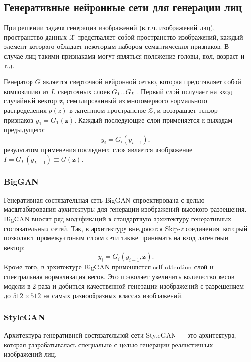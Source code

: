 \subsection{Генеративные нейронные сети для генерации лиц}

При решении задачи генерации изображений (в.т.ч. изображений лиц), пространство данных $\mathcal X$ предстваляет собой пространство изображений, каждый элемент которого обладает некоторым набором семантических признаков.
В случае лиц такими признаками могут являться положение головы, пол, возраст и т.д.

Генератор $G$ является сверточной нейронной сетью, которая представляет собой композицию из $L$ сверточных слоев $G_1 ... G_L$ . 
Первый слой получает на вход случайный вектор $\mathbf z$, семплированный из многомерного нормального распределения $p(z)$ в латентном пространстве $\mathcal Z$, и возвращает тензор признаков $y_1 = G_1(\mathbf z)$. 
Каждый последующие слои применяется к выходам предыдущего: 
$$ y_i = G_i(y_{i-1}), $$
результатом применения последнего слоя является изображение $I = G_L(y_{L-1}) \equiv G(\mathbf z)$.

\subsubsection{BigGAN}

Генеративная состязательная сеть BigGAN \cite{bigGAN} спроектирована с целью масштабирования архитектуры для генерации изображений высокого разрешения.
BigGAN вносит ряд модификаций в стандартную архитектуру генеративных состязательных сетей.
Так, в архитектуру внедряются Skip\emph{-z} соединения, который позволяют промежучтоным слоям сети также принимать на вход латентный вектор:
$$ y_i = G_i(y_{i-1}, \mathbf z). $$
Кроме того, в архитектуре BigGAN применяются self-attention слой и спектральная нормализация весов.
Это позволяет увеличить количество весов модели в 2 раза и добиться качественной генерации изображений с разрешением до $512\times512$ на самых разнообразных классах изображений.

\subsubsection{StyleGAN}
Архитектура генеративной состязательной сети StyleGAN \cite{StyleGAN} --– это архитектура, которая разрабатывалась специально с целью генерации реалистичных изображений лиц.

